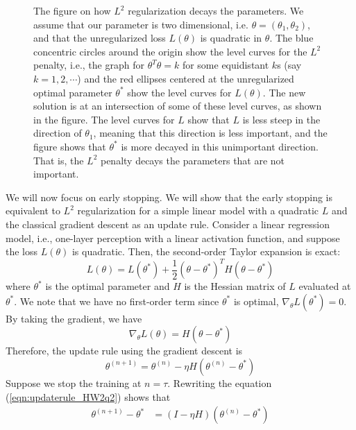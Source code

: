 \documentclass[
	12pt, %
]{../Template/fphw}
\begin{document}
\begin{enumerate}[label = (\arabic*)]
\begin{figure}[!htbp]
\begin{tikzpicture}[x=0.75pt,y=0.75pt,yscale=-1,xscale=1]
\end{tikzpicture}
    \caption{The figure on how $L^2$ regularization decays the parameters. We assume that our parameter is two dimensional, i.e. $\theta=(\theta_1,\theta_2)$, and that the unregularized loss $L(\theta)$ is quadratic in $\theta$. The blue concentric circles around the origin show the level curves for the $L^2$ penalty, i.e., the graph for $\theta^T \theta = k$ for some equidistant $k$s (say $k=1,2,\cdots$) and the red ellipses centered at the unregularized optimal parameter $\theta^*$ show the level curves for $L(\theta)$. The new solution is at an intersection of some of these level curves, as shown in the figure. The level curves for $L$ show that $L$ is less steep in the direction of $\theta_1$, meaning that this direction is less important, and the figure shows that $\theta^*$ is more decayed in this unimportant direction. That is, the $L^2$ penalty decays the parameters that are not important. }
    \label{fig:l2reg}
\end{figure}
    We will now focus on early stopping. We will show that the early stopping is equivalent to $L^2$ regularization for a simple linear model with a quadratic $L$ and the classical gradient descent as an update rule. Consider a linear regression model, i.e., one-layer perception with a linear activation function, and suppose the loss $L(\theta)$ is quadratic. Then, the second-order Taylor expansion is exact:
    \begin{equation}
        L(\theta) = L(\theta^*) + \frac{1}{2}(\theta-\theta^*)^T H(\theta-\theta^*)
    \end{equation}
    where $\theta^*$ is the optimal parameter and $H$ is the Hessian matrix of $L$ evaluated at $\theta^*$. We note that we have no first-order term since $\theta^*$ is optimal, $\nabla_{\theta}L(\theta^*)=0$. By taking the gradient, we have
    \begin{equation}
        \nabla_{\theta} L(\theta) = H(\theta-\theta^*)
    \end{equation}
    Therefore, the update rule using the gradient descent is 
    \begin{equation}
        \label{eqn:updaterule_HW2q2}
        \theta^{(n+1)} = \theta^{(n)} - \eta H(\theta^{(n)}-\theta^*)
    \end{equation}
    Suppose we stop the training at $n=\tau$. Rewriting the equation (\ref{eqn:updaterule_HW2q2}) shows that
    \begin{align}
        \theta^{(n+1)}-\theta^* &= (I-\eta H)(\theta^{(n)}-\theta^*)

\end{align}
\end{enumerate}
\end{document}
